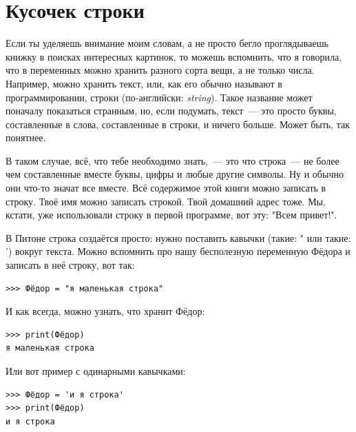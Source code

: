 
\section{Кусочек строки}

Если ты уделяешь внимание моим словам, а не просто бегло проглядываешь книжку в поисках интересных картинок, то можешь вспомнить, что я говорила, что в переменных можно хранить разного сорта вещи, а не только числа. Например, можно хранить текст, или, как его обычно называют в программировании, строки (по-английски: \emph{string}). Такое название может поначалу показаться странным, но, если подумать, текст — это просто буквы, составленные в слова, составленные в строки, и ничего больше. Может быть, так понятнее.


В таком случае, всё, что тебе необходимо знать, — это что строка — не более чем составленные вместе буквы, цифры и любые другие символы. Ну и обычно они что-то значат все вместе. Всё содержимое этой книги можно записать в строку. Твоё имя можно записать строкой. Твой домашний адрес тоже. Мы, кстати, уже использовали строку в первой программе, вот эту: "Всем привет!".

В Питоне строка создаётся просто: нужно поставить кавычки (такие: " или такие: ') вокруг текста. Можно вспомнить про нашу бесполезную переменную Фёдора и записать в неё строку, вот так:

\begin{listing}
\begin{verbatim}
>>> Фёдор = "я маленькая строка"
\end{verbatim}
\end{listing}

И как всегда, можно узнать, что хранит Фёдор:

\begin{listing}
\begin{verbatim}
>>> print(Фёдор)
я маленькая строка
\end{verbatim}
\end{listing}

Или вот пример с одинарными кавычками:

\begin{listing}
\begin{verbatim}
>>> Фёдор = 'и я строка'
>>> print(Фёдор)
и я строка
\end{verbatim}
\end{listing}

